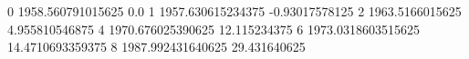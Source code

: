 0 1958.560791015625 0.0
1 1957.630615234375 -0.93017578125
2 1963.5166015625 4.955810546875
4 1970.676025390625 12.115234375
6 1973.0318603515625 14.4710693359375
8 1987.992431640625 29.431640625
